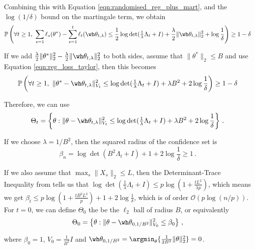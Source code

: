 Combining this with Equation \eqref{eqn:randomised_reg_plus_mart}, and the $\log(1/\delta)$ bound on the martingale term, we obtain
\begin{equation*}
\mathbb{P}\left(\forall t \geq 1, ~\sum_{s=1}\ell_s(\theta^*) - \sum_{s=1}^{t}\ell_t(\wh\theta_{t,\lambda}) \leq \frac{1}{2}\log\det(\tfrac{1}{\lambda}\Lambda_t + I) + \frac{\lambda}{2}\|\wh\theta_{t,\lambda}\|_2^2 + \log\frac{1}{\delta}\right) \geq 1 - \delta
\end{equation*}

If we add $\frac{\lambda}{2}\|\theta^*\|_2^2 - \frac{\lambda}{2}\|\wh\theta_{t,\lambda}\|_2^2$ to both sides, assume that $\|\theta^*\|_2 \leq B$ and use Equation \eqref{eqn:reg_loss_taylor}, then this becomes
\begin{equation*}
\mathbb{P}\left(\forall t \geq 1, ~\|\theta^* - \wh\theta_{t,\lambda}\|_{V_t}^2 \leq \log\det(\tfrac{1}{\lambda}\Lambda_t + I) + \lambda B^2 + 2\log\frac{1}{\delta}\right) \geq 1 - \delta
\end{equation*}

Therefore, we can use
\begin{equation*}
\Theta_t = \left\{\theta: \|\theta - \wh\theta_{t,\lambda}\|_{V_t}^2 \leq \log\det(\tfrac{1}{\lambda}\Lambda_t + I) + \lambda B^2 + 2\log\frac{1}{\delta}\right\}\,.
\end{equation*}

If we choose $\lambda = 1/B^2$, then the squared radius of the confidence set is
\begin{equation*}
\beta_n = \log\det(B^2\Lambda_t + I) + 1 + 2\log\frac{1}{\delta} \geq 1\,.
\end{equation*}

If we also assume that $\max_{s}\|X_s\|_2 \leq L$, then the Determinant-Trace Inequality from \citet{abbasi2011improved} tells us that $\log\det(\tfrac{1}{\lambda}\Lambda_t + I) \leq p\log(1 + \frac{tL^2}{\lambda p})$, which means we get $\beta_t \leq p\log(1 + \frac{tB^2L^2}{p})  + 1 + 2\log\frac{1}{\delta}$, which is of order $\mathcal{O}(p\log(n/p))$. For $t=0$, we can define $\Theta_0$ the be the $\ell_2$ ball of radius $B$, or equivalently
\begin{equation*}
\Theta_0 = \left\{\theta: \|\theta - \wh\theta_{0,1/B^2}\|_{V_0}^2 \leq \beta_0\right\}\,,
\end{equation*}

where $\beta_0 = 1$, $V_0 = \frac{1}{B^2}I$ and $\wh\theta_{0,1/B^2} = \argmin_{\theta}\{\frac{1}{2B^2}\|\theta\|_2^2\} = 0$.

